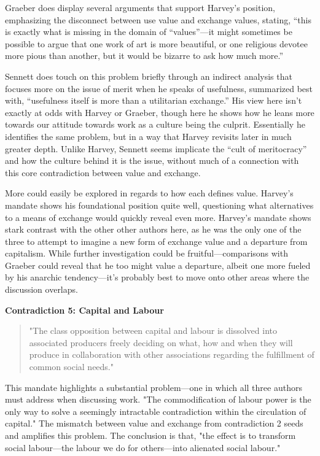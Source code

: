 \documentclass[12pt,a4paper]{article}
\begin{document}
Graeber does display several arguments that support Harvey’s position, emphasizing the disconnect between use value and exchange values, stating, “this is exactly what is missing in the domain of “values”---it might sometimes be possible to argue that one work of art is more beautiful, or one religious devotee more pious than another, but it would be bizarre to ask how much more.” \cite{bs}
\vspace*{10pt}

Sennett does touch on this problem briefly through an indirect analysis that focuses more on the issue of merit when he speaks of usefulness, summarized best with, “usefulness itself is more than a utilitarian exchange.” \cite{new} His view here isn’t exactly at odds with Harvey or Graeber, though here he shows how he leans more towards our attitude towards work as a culture being the culprit. Essentially he identifies the same problem, but in a way that Harvey revisits later in much greater depth. Unlike Harvey, Sennett seems implicate the “cult of meritocracy” \cite{new} and how the culture behind it is the issue, without much of a connection with this core contradiction between value and exchange.

More could easily be explored in regards to how each defines value. Harvey's mandate shows his foundational position quite well, questioning what alternatives to a means of exchange would quickly reveal even more. Harvey's mandate shows stark contrast with the other other authors here, as he was the only one of the three to attempt to imagine a new form of exchange value and a departure from capitalism.  While further investigation could be fruitful---comparisons with Graeber could reveal that he too might value a departure, albeit one more fueled by his anarchic tendency---it's probably best to move onto other areas where the discussion overlaps. 

\textbf{Contradiction 5: Capital and Labour}
\begin{quotation} {\color{G-Moon}
    \noindent "The class opposition between capital and labour is dissolved into associated producers freely deciding on what, how and when they will produce in collaboration with other associations regarding the fulfillment of common social needs." \cite{con}}
\end{quotation}
This mandate highlights a substantial problem---one in which all three authors must address when discussing work. "The commodification of labour power is the only way to solve a seemingly intractable contradiction within the circulation of capital." \cite{con} The mismatch between value and exchange from contradiction 2 seeds and amplifies this problem. The conclusion is that, "the effect is to transform social labour---the labour we do for others---into alienated social labour." \cite{con} 
\vspace*{10pt}
\end{document}
